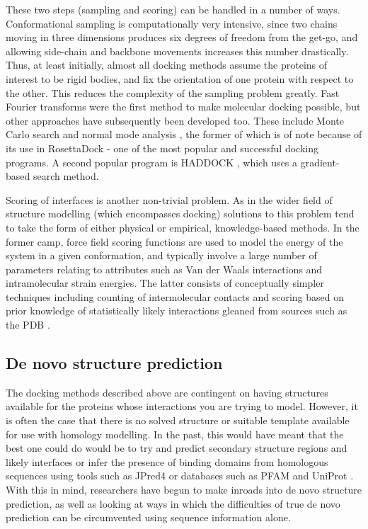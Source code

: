 \documentclass[a4paper,11pt,twoside,openright]{scrbook}
\begin{document}
These two steps (sampling and scoring) can be handled in a number of ways.
Conformational sampling is computationally very intensive, since two chains
moving in three dimensions produces six degrees of freedom from the get-go, and
allowing side-chain and backbone movements increases this number drastically.
Thus, at least initially, almost all docking methods assume the proteins of
interest to be rigid bodies, and fix the orientation of one protein with respect
to the other. This reduces the complexity of the sampling problem greatly. Fast
Fourier transforms \cite{Katchalski-Katzir1992} were the first method to make
molecular docking possible, but other approaches have subsequently been
developed too. These include Monte Carlo search \cite{Hart1992} and normal mode
analysis \cite{Zacharias2005}, the former of which is of note because of its use
in RosettaDock \cite{Lyskov2008,Zhang2015} - one of the most popular and
successful docking programs. A second popular program is HADDOCK
\cite{Dominguez2003,VanZundert2016}, which uses a gradient-based search method.

Scoring of interfaces is another non-trivial problem. As in the wider field of
structure modelling (which encompasses docking) solutions to this problem tend
to take the form of either physical or empirical, knowledge-based methods. In
the former camp, force field scoring functions \cite{Kynast2016} are used to
model the energy of the system in a given conformation, and typically involve a
large number of parameters relating to attributes such as Van der Waals
interactions and intramolecular strain energies. The latter consists of
conceptually simpler techniques including counting of intermolecular contacts
and scoring based on prior knowledge of statistically likely interactions
gleaned from sources such as the PDB \cite{Bohm1998,Sasse2017}.

\subsection{De novo structure prediction}
The docking methods described above are contingent on having structures
available for the proteins whose interactions you are trying to model. However,
it is often the case that there is no solved structure or suitable template
available for use with homology modelling. In the past, this would have meant
that the best one could do would be to try and predict secondary structure
regions and likely interfaces or infer the presence of binding domains from
homologous sequences using tools such as JPred4 \cite{Drozdetskiy2015} or
databases such as PFAM and UniProt \cite{Finn2016,Consortium2017}. With this in
mind, researchers have begun to make inroads into de novo structure prediction,
as well as looking at ways in which the difficulties of true de novo prediction
can be circumvented using sequence information alone.
\end{document}
